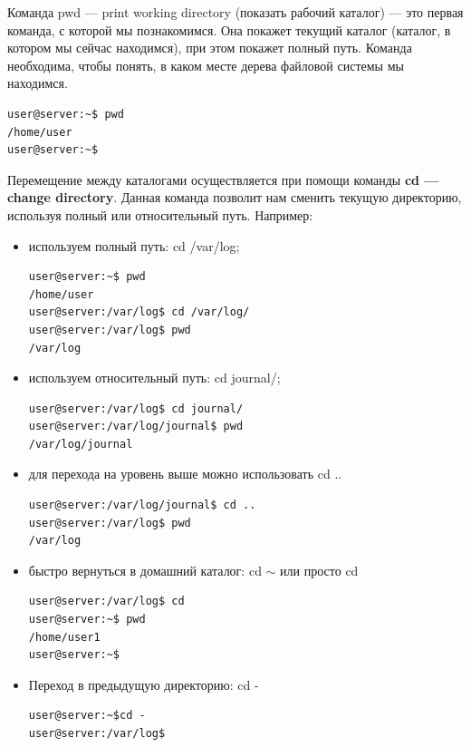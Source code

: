 \documentclass[14pt, a4paper]{article}
\begin{document}
Команда \colorbox{backcolour}{pwd — print working directory} (показать рабочий каталог) — это первая
команда, с которой мы познакомимся. Она покажет текущий каталог (каталог, в котором мы сейчас
находимся), при этом покажет полный путь. Команда необходима, чтобы понять, в каком месте дерева
файловой системы мы находимся.

\begin{lstlisting}
user@server:~$ pwd
/home/user
user@server:~$
\end{lstlisting}

Перемещение между каталогами осуществляется при помощи команды \textbf{cd — change
directory}. Данная команда позволит нам сменить текущую директорию, используя полный или
относительный путь. Например:

\begin{itemize}
    \item используем полный путь: \colorbox{backcolour}{cd /var/log};
\begin{lstlisting}
user@server:~$ pwd
/home/user
user@server:/var/log$ cd /var/log/
user@server:/var/log$ pwd
/var/log
\end{lstlisting}
    \item используем относительный путь: \colorbox{backcolour}{cd journal/};
\begin{lstlisting}
user@server:/var/log$ cd journal/
user@server:/var/log/journal$ pwd
/var/log/journal
\end{lstlisting}
    \item для перехода на уровень выше можно использовать \colorbox{backcolour}{cd ..}
\begin{lstlisting}
user@server:/var/log/journal$ cd ..
user@server:/var/log$ pwd
/var/log
\end{lstlisting}
    \item быстро вернуться в домашний каталог: \colorbox{backcolour}{cd $\sim$} или просто \colorbox{backcolour}{cd}
\begin{lstlisting}
user@server:/var/log$ cd
user@server:~$ pwd
/home/user1
user@server:~$
\end{lstlisting}
    \item Переход в предыдущую директорию: \colorbox{backcolour}{cd -}
    
\begin{lstlisting}
user@server:~$cd -
user@server:/var/log$
\end{lstlisting}
\end{itemize}
\end{document}
